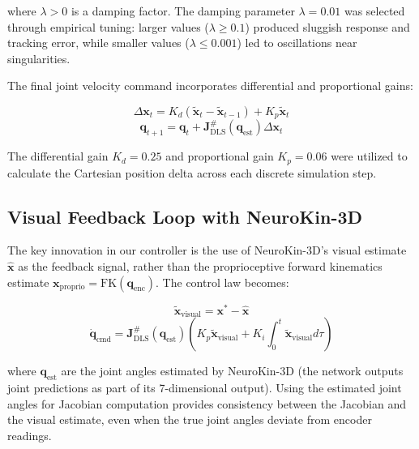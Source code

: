 \documentclass[12pt,a4paper,oneside]{report}
\begin{document}
where $\lambda > 0$ is a damping factor. The damping parameter $\lambda = 0.01$ was selected through empirical tuning: larger values ($\lambda \geq 0.1$) produced sluggish response and tracking error, while smaller values ($\lambda \leq 0.001$) led to oscillations near singularities.

The final joint velocity command incorporates differential and proportional gains:

\begin{equation}
\Delta \mathbf{x}_t = K_d (\tilde{\mathbf{x}}_t - \tilde{\mathbf{x}}_{t-1}) + K_p \tilde{\mathbf{x}}_t
\end{equation}
\begin{equation}
\mathbf{q}_{t+1} = \mathbf{q}_t + \mathbf{J}^{\#}_{\text{DLS}}(\mathbf{q}_{\text{est}}) \Delta \mathbf{x}_t
\end{equation}

The differential gain $K_d = 0.25$ and proportional gain $K_p = 0.06$ were utilized to calculate the Cartesian position delta across each discrete simulation step.

\subsection{Visual Feedback Loop with NeuroKin-3D}
\label{subsec:visual_feedback_loop_with_neurokin_3d}

The key innovation in our controller is the use of NeuroKin-3D's visual estimate $\hat{\mathbf{x}}$ as the feedback signal, rather than the proprioceptive forward kinematics estimate $\mathbf{x}_{\text{proprio}} = \text{FK}(\mathbf{q}_{\text{enc}})$. The control law becomes:

\begin{equation}
\tilde{\mathbf{x}}_{\text{visual}} = \mathbf{x}^* - \hat{\mathbf{x}}
\end{equation}
\begin{equation}
\dot{\mathbf{q}}_{\text{cmd}} = \mathbf{J}^{\#}_{\text{DLS}}(\mathbf{q}_{\text{est}}) \left( K_p \tilde{\mathbf{x}}_{\text{visual}} + K_i \int_0^t \tilde{\mathbf{x}}_{\text{visual}} d\tau \right)
\end{equation}

where $\mathbf{q}_{\text{est}}$ are the joint angles estimated by NeuroKin-3D (the network outputs joint predictions as part of its 7-dimensional output). Using the estimated joint angles for Jacobian computation provides consistency between the Jacobian and the visual estimate, even when the true joint angles deviate from encoder readings.
\end{document}
